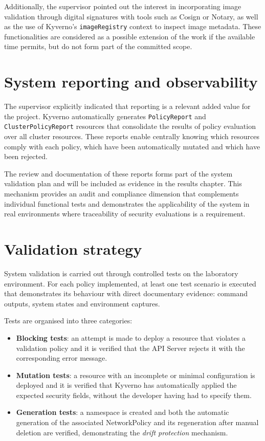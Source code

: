 Additionally, the supervisor pointed out the interest in incorporating image validation through digital signatures with tools such as Cosign or Notary, as well as the use of Kyverno's \texttt{imageRegistry} context to inspect image metadata. These functionalities are considered as a possible extension of the work if the available time permits, but do not form part of the committed scope.

\section{System reporting and observability}

The supervisor explicitly indicated that reporting is a relevant added value for the project. Kyverno automatically generates \texttt{PolicyReport} and \texttt{ClusterPolicyReport} resources that consolidate the results of policy evaluation over all cluster resources. These reports enable centrally knowing which resources comply with each policy, which have been automatically mutated and which have been rejected.

The review and documentation of these reports forms part of the system validation plan and will be included as evidence in the results chapter. This mechanism provides an audit and compliance dimension that complements individual functional tests and demonstrates the applicability of the system in real environments where traceability of security evaluations is a requirement.

\section{Validation strategy}

System validation is carried out through controlled tests on the laboratory environment. For each policy implemented, at least one test scenario is executed that demonstrates its behaviour with direct documentary evidence: command outputs, system states and environment captures.

Tests are organised into three categories:

\begin{itemize}
    \item \textbf{Blocking tests}: an attempt is made to deploy a resource that violates a validation policy and it is verified that the API Server rejects it with the corresponding error message.
    \item \textbf{Mutation tests}: a resource with an incomplete or minimal configuration is deployed and it is verified that Kyverno has automatically applied the expected security fields, without the developer having had to specify them.
    \item \textbf{Generation tests}: a namespace is created and both the automatic generation of the associated NetworkPolicy and its regeneration after manual deletion are verified, demonstrating the \textit{drift protection} mechanism.
\end{itemize}

